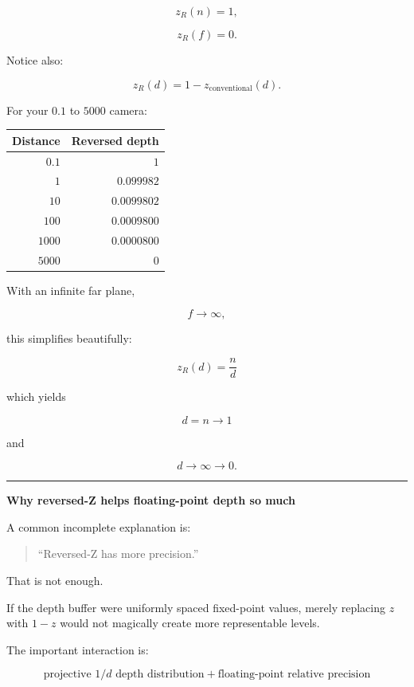 \[
z_R(n)=1,
\]

\[
z_R(f)=0.
\]

Notice also:

\[
z_R(d)=1-z_{\text{conventional}}(d).
\]

For your \(0.1\) to \(5000\) camera:

{\def\LTcaptype{none} %
\begin{longtable}[]{@{}rr@{}}
\toprule\noalign{}
Distance & Reversed depth \\
\midrule\noalign{}
\endhead
\bottomrule\noalign{}
\endlastfoot
\(0.1\) & \(1\) \\
\(1\) & \(0.099982\) \\
\(10\) & \(0.0099802\) \\
\(100\) & \(0.0009800\) \\
\(1000\) & \(0.0000800\) \\
\(5000\) & \(0\) \\
\end{longtable}
}

With an infinite far plane,

\[
f\rightarrow\infty,
\]

this simplifies beautifully:

\[
\boxed{
z_R(d)=\frac nd
}
\]

which yields

\[
d=n\rightarrow1
\]

and

\[
d\rightarrow\infty\rightarrow0.
\]

\begin{center}\rule{0.5\linewidth}{0.5pt}\end{center}

\textbf{Why reversed-Z helps floating-point depth so much}

A common incomplete explanation is:

\begin{quote}
``Reversed-Z has more precision.''
\end{quote}

That is not enough.

If the depth buffer were uniformly spaced fixed-point values, merely replacing \(z\) with \(1-z\) would not magically create more representable levels.

The important interaction is:

\[
\boxed{
\text{projective }1/d\text{ depth distribution}
+
\text{floating-point relative precision}
}
\]

